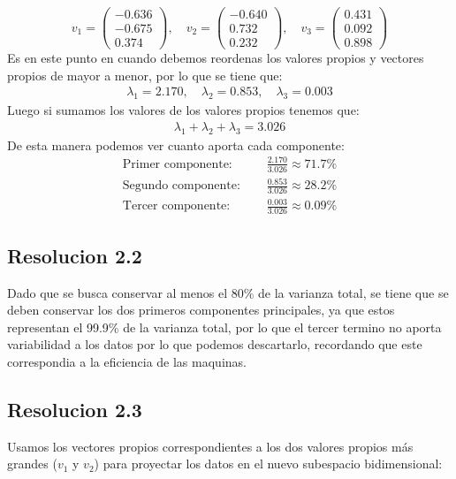 \documentclass[
  11pt,
  letterpaper,
   addpoints,
   answers
  ]{exam}
\begin{document}
\begin{questions}
\begin{solution}
\[
v_1 = \begin{pmatrix} -0.636 \\ -0.675 \\ 0.374 \end{pmatrix}, \quad 
v_2 = \begin{pmatrix} -0.640 \\ 0.732 \\ 0.232 \end{pmatrix}, \quad 
v_3 = \begin{pmatrix} 0.431 \\ 0.092 \\ 0.898 \end{pmatrix}
\]
Es en este punto en cuando debemos reordenas los valores propios y vectores propios de mayor a menor, por lo que se tiene que:
\begin{align}
    \lambda_1 = 2.170, \quad \lambda_2 = 0.853, \quad \lambda_3 = 0.003
\end{align}
Luego si sumamos los valores de los valores propios tenemos que:
\begin{align}
    \lambda_1 + \lambda_2 + \lambda_3 = 3.026
\end{align}
De esta manera podemos ver cuanto aporta cada componente:
\begin{align}
    \text{Primer componente: } &\quad \frac{2.170}{3.026} \approx 71.7\% \\
    \text{Segundo componente: } &\quad \frac{0.853}{3.026} \approx 28.2\% \\
    \text{Tercer componente: } &\quad \frac{0.003}{3.026} \approx 0.09\%
\end{align}
\subsection*{Resolucion 2.2}
 Dado que se busca conservar al menos el 80\% de la varianza total, se tiene que se deben conservar los dos primeros componentes principales, ya que estos representan el 99.9\% de la varianza total, por lo que el tercer termino no aporta variabilidad a los datos por lo que podemos descartarlo, recordando que este correspondia a la eficiencia de las maquinas.
 \subsection{Resolucion 2.3}
 Usamos los vectores propios correspondientes a los dos valores propios más grandes (\(v_1\) y \(v_2\)) para proyectar los datos en el nuevo subespacio bidimensional:


\end{solution}
\end{questions}
\end{document}
